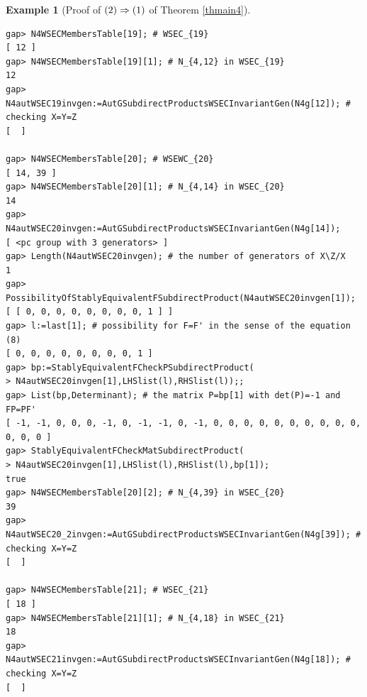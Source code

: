 \documentclass{amsart}
\theoremstyle{plain}
\theoremstyle{definition}
\newtheorem{example}[theorem]{Example}
\theoremstyle{remark}
\begin{document}
\begin{example}[Proof of ${\rm (2)}\Rightarrow {\rm (1)}$ of {Theorem \ref{thmain4}}]
\begin{verbatim}
gap> N4WSECMembersTable[19]; # WSEC_{19}
[ 12 ]
gap> N4WSECMembersTable[19][1]; # N_{4,12} in WSEC_{19}
12
gap> N4autWSEC19invgen:=AutGSubdirectProductsWSECInvariantGen(N4g[12]); # checking X=Y=Z
[  ]

gap> N4WSECMembersTable[20]; # WSEWC_{20}
[ 14, 39 ]
gap> N4WSECMembersTable[20][1]; # N_{4,14} in WSEC_{20}
14
gap> N4autWSEC20invgen:=AutGSubdirectProductsWSECInvariantGen(N4g[14]);
[ <pc group with 3 generators> ]
gap> Length(N4autWSEC20invgen); # the number of generators of X\Z/X
1
gap> PossibilityOfStablyEquivalentFSubdirectProduct(N4autWSEC20invgen[1]);
[ [ 0, 0, 0, 0, 0, 0, 0, 0, 1 ] ]
gap> l:=last[1]; # possibility for F=F' in the sense of the equation (8)
[ 0, 0, 0, 0, 0, 0, 0, 0, 1 ]
gap> bp:=StablyEquivalentFCheckPSubdirectProduct(
> N4autWSEC20invgen[1],LHSlist(l),RHSlist(l));;
gap> List(bp,Determinant); # the matrix P=bp[1] with det(P)=-1 and FP=PF'
[ -1, -1, 0, 0, 0, -1, 0, -1, -1, 0, -1, 0, 0, 0, 0, 0, 0, 0, 0, 0, 0, 0, 0, 0 ]
gap> StablyEquivalentFCheckMatSubdirectProduct(
> N4autWSEC20invgen[1],LHSlist(l),RHSlist(l),bp[1]);
true
gap> N4WSECMembersTable[20][2]; # N_{4,39} in WSEC_{20}
39
gap> N4autWSEC20_2invgen:=AutGSubdirectProductsWSECInvariantGen(N4g[39]); # checking X=Y=Z
[  ]

gap> N4WSECMembersTable[21]; # WSEC_{21}
[ 18 ]
gap> N4WSECMembersTable[21][1]; # N_{4,18} in WSEC_{21}
18
gap> N4autWSEC21invgen:=AutGSubdirectProductsWSECInvariantGen(N4g[18]); # checking X=Y=Z
[  ]


\end{verbatim}
\end{example}
\end{document}
